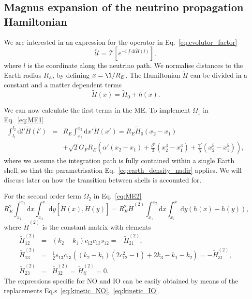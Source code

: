 \documentclass{article}
\newcommand{\de}[0]{\text{d}}
\begin{document}
\subsection{Magnus expansion of the neutrino propagation Hamiltonian}
We are interested in an expression for the operator in Eq.~\ref{eq:evolutor_factor}
\begin{equation}
	\tilde{\mathcal{U}} = \mathcal{T} \left[ e^{- i \int \de l \tilde{H}(l)} \right],
\end{equation}
where $l$ is the coordinate along the neutrino path. We normalise distances to the Earth radius $R_E$, by defining $x = \l/R_E$. The Hamiltonian $\tilde{H}$ can be divided in a constant and a matter dependent terms
\begin{equation}
	\tilde{H}(x) = \tilde{H}_0 + h(x).
\end{equation}

We can now calculate the first terms in the ME. To implement $\Omega_1$ in Eq.~\ref{eq:ME1}
\begin{eqnarray}
	\int_{l_1}^{l_2} \de l' \tilde{H}(l') &=& R_E \int_{x_1}^{x_2} \de x' \tilde{H}(x') = R_E \tilde{H}_0 \left(x_2 - x_1 \right) \label{eq:ME1}\\
	&& + \sqrt{2} G_F R_E \left( \alpha' \left( x_2 - x_1 \right) + \frac{\beta'}{3} \left(x_2^3 - x_1^3\right) + \frac{\gamma'}{5} \left(x_2^5 - x_1^5\right) \right),\nonumber
\end{eqnarray}
where we assume the integration path is fully contained within a single Earth shell, so that the parametrisation Eq.~\ref{eq:earth_density_nadir} applies. We will discuss later on how the transition between shells is accounted for.

For the second order term $\Omega_2$ in Eq.~\ref{eq:ME2}
\begin{equation}
	R_E^2 \int_{x_1}^{x_2} \de x \int_{x_1}^x \de y \left[ \tilde{H}(x), \tilde{H}(y) \right] = R_E^2 \tilde{H}^{(2)} \int_{x_1}^{x_2} \de x \int_{x_1}^x \de y \left(h(x) - h(y) \right),
\end{equation}
where $\tilde{H}^{(2)}$ is the constant matrix with elements
\begin{eqnarray}
\tilde{H}^{(2)}_{12} &=& \left(k_2 - k_1\right) c_{12} c_{13} s_{12} = -\tilde{H}^{(2)}_{21}, \\
\tilde{H}^{(2)}_{13} &=& \frac{1}{2} s_{13} c_{13} \left( \left(k_2-k_1 \right) \left(2 c_{12}^2 - 1 \right) + 2k_3 -k_1 - k_2 \right) = -\tilde{H}^{(2)}_{31},\\
\tilde{H}^{(2)}_{23} &=& \tilde{H}^{(2)}_{32} = \tilde{H}^{(2)}_{ii} = 0.
\end{eqnarray}
The expressions specific for NO and IO can be easily obtained by means of the replacements Eq.s~\ref{eq:kinetic_NO},~\ref{eq:kinetic_IO}.
\end{document}

